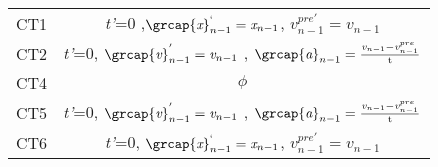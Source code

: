 {\begin{table}[]
{\begin{tabular}{ |c|c| }
			CT1 & \textit{t'}=0 ,${\grcap{\textit{x}}_{n-1}^{`}= \textit{x}_{n-1}}$,
			${\textit{v}_{n-1}^{{pre}{'}}= \textit{v}_{n-1}}$ \\
			CT2 & \textit{t'}=0, ${\grcap{\textit{v}}_{n-1}^{'}= \textit{v}_{n-1}}$ ,
			${\grcap{\textit{a}}_{n-1} = \frac{\textit{v}_{n-1} -\textit{v}_{n-1}^{pre} }{\text{t}}}$ \\
			CT4 & $\phi$ \\
			CT5 & \textit{t'}=0, ${\grcap{\textit{v}}_{n-1}^{'}= \textit{v}_{n-1}}$ ,
			${\grcap{\textit{a}}_{n-1} = \frac{\textit{v}_{n-1} -\textit{v}_{n-1}^{pre} }{\text{t}}}$ \\
			CT6 & \textit{t'}=0, ${\grcap{\textit{x}}_{n-1}^{`}= \textit{x}_{n-1}}$,
			${\textit{v}_{n-1}^{{pre}{'}}= \textit{v}_{n-1}}$ \\
			
			
			
			\hline
			
	\end{tabular}}
\end{table}

 
}

